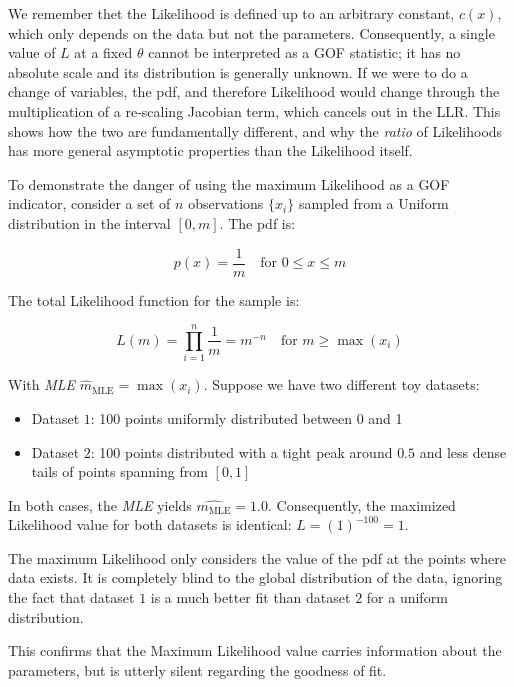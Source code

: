 We remember thet the Likelihood is defined up to an arbitrary constant, $c(x)$, which only depends on the data but not the parameters. Consequently, a single value of $L$ at a fixed $\theta$ cannot be interpreted as a GOF statistic; it has no absolute scale and its distribution is generally unknown. If we were to do a change of variables, the pdf, and therefore Likelihood would change through the multiplication of a re-scaling Jacobian term, which cancels out in the LLR. This shows how the two are fundamentally different, and why the \emph{ratio} of Likelihoods has more general asymptotic properties than the Likelihood itself.

\begin{example}
	To demonstrate the danger of using the maximum Likelihood as a GOF indicator, consider a set of $n$ observations $\{x_i\}$ sampled from a Uniform distribution in the interval $[0, m]$. The pdf is:
	
	\[
	p(x) = \frac{1}{m} \quad \text{for } 0 \le x \le m
	\]
	
	The total Likelihood function for the sample is:
	
	\[
	L(m) = \prod_{i=1}^{n} \frac{1}{m} = m^{-n} \quad \text{for } m \geq \max\left(x_i\right) 
	\]
	
	With \emph{MLE} $\hat{m}_{\text{MLE}} = \max\left(x_i\right)$. Suppose we have two different toy datasets:
	
	\begin{itemize}
		\item Dataset $1$: 100 points uniformly distributed between 0 and 1
		\item Dataset $2$: 100 points distributed with a tight peak around $0.5$ and less dense tails of points spanning from $[0,1]$ 
	\end{itemize}
	
	In both cases, the  \emph{MLE}  yields $\hat{m_{\text{MLE}}} = 1.0$. Consequently, the maximized Likelihood value for both datasets is identical: $L = (1)^{-100} = 1$.
	
	The maximum Likelihood only considers the value of the pdf at the points where data exists. It is completely blind to the global distribution of the data, ignoring the fact that dataset $1$ is a much better fit than dataset $2$ for a uniform distribution. 
	
	This confirms that the Maximum Likelihood value carries information about the parameters, but is utterly silent regarding the goodness of fit.
\end{example}

